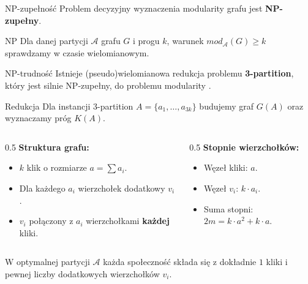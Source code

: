 \documentclass{beamer}
\begin{document}
\begin{frame}{NP-zupełność}
    Problem decyzyjny wyznaczenia modularity grafu jest \textbf{NP-zupełny}.

    \vspace{0.7cm}
    \begin{block}{NP}
        Dla danej partycji $\mathcal{A}$ grafu $G$ i progu $k$, warunek $mod_{\mathcal{A}}(G) \geq k$ sprawdzamy w czasie wielomianowym.
    \end{block}

    \begin{block}{NP-trudność}
        Istnieje (pseudo)wielomianowa redukcja problemu \textbf{3-partition}, który jest silnie NP-zupełny, do problemu modularity \cite{BD08}.
    \end{block}
\end{frame}

\begin{frame}{Redukcja}
    Dla instancji 3-partition $A = \{a_1, \ldots, a_{3k}\}$ budujemy graf $G(A)$ oraz wyznaczamy próg \(K(A)\).
    \vspace{0.5cm}
    \begin{columns}[T]
        \begin{column}{0.5\textwidth}
            \textbf{Struktura grafu:}
            \begin{itemize}
                \item $k$ klik o rozmiarze $a = \sum a_i$.
                \item Dla każdego $a_i$ wierzchołek dodatkowy $v_i$.
                \item $v_i$ połączony z $a_i$ wierzchołkami \textbf{każdej} kliki.
            \end{itemize}
        \end{column}
        \begin{column}{0.5\textwidth}
            \textbf{Stopnie wierzchołków:}
            \begin{itemize}
                \item Węzeł kliki: $a$.
                \item Węzeł $v_i$: $k \cdot a_i$.
                \item Suma stopni: $2m = k \cdot a^2 + k \cdot a$.
            \end{itemize}
        \end{column}
    \end{columns}

    \vspace{0.5cm}
    W optymalnej partycji \(\mathcal{A}\) każda społeczność składa się z dokładnie \(1\) kliki i pewnej liczby dodatkowych wierzchołków \(v_i\).
\end{frame}
\end{document}
